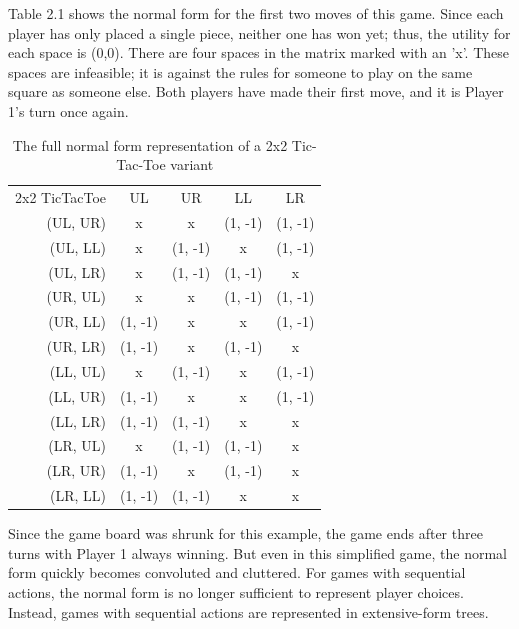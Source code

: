 Table 2.1 shows the normal form for the first two moves of this game. Since each player has only placed a single piece, neither one has won yet; thus, the utility for each space is (0,0). There are four spaces in the matrix marked with an 'x'. These spaces are infeasible; it is against the rules for someone to play on the same square as someone else. Both players have made their first move, and it is Player 1's turn once again.\\
\begin{table}[h]
  \centering
  \begin{tabular}{r | c | c | c | c |}
    \multicolumn{1}{c}{2x2 TicTacToe}&\multicolumn{1}{c}{UL}&\multicolumn{1}{c}{UR}&
    \multicolumn{1}{c}{LL}&\multicolumn{1}{c}{LR}\\ \cline{2-5}
    (UL, UR) & x & x & (1, -1) & (1, -1) \\ \cline{2-5}
    (UL, LL) & x & (1, -1) & x & (1, -1) \\ \cline{2-5}
    (UL, LR) & x & (1, -1) & (1, -1) & x \\ \cline{2-5}
    (UR, UL) & x & x & (1, -1) & (1, -1) \\ \cline{2-5}
    (UR, LL) & (1, -1) & x & x & (1, -1) \\ \cline{2-5}
    (UR, LR) & (1, -1) & x & (1, -1) & x \\ \cline{2-5}
    (LL, UL) & x & (1, -1) & x & (1, -1) \\ \cline{2-5}
    (LL, UR) & (1, -1) & x & x & (1, -1) \\ \cline{2-5}
    (LL, LR) & (1, -1) & (1, -1) & x & x \\ \cline{2-5}
    (LR, UL) & x & (1, -1) & (1, -1) & x \\ \cline{2-5}
    (LR, UR) & (1, -1) & x & (1, -1) & x \\ \cline{2-5}
    (LR, LL) & (1, -1) & (1, -1) & x & x \\ \cline{2-5}
  \end{tabular}
  \caption{The full normal form representation of a 2x2 Tic-Tac-Toe variant}
\end{table}

Since the game board was shrunk for this example, the game ends after three turns with Player 1 always winning. But even in this simplified game, the normal form quickly becomes convoluted and cluttered. For games with sequential actions, the normal form is no longer sufficient to represent player choices. Instead, games with sequential actions are represented in extensive-form trees.\\

